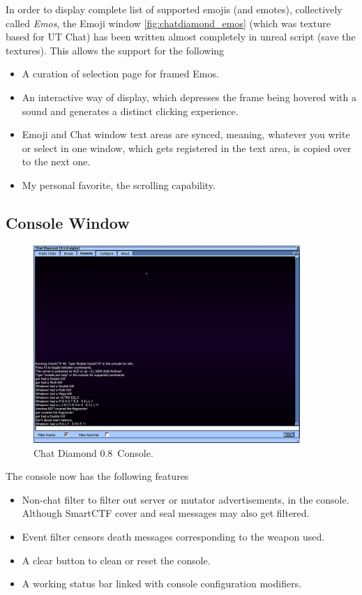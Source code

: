 \documentclass{article}
\theoremstyle{definition}
\newcommand{\ChatDiamondVersion}{0.8}
\begin{document}
In order to display complete list of supported emojis (and emotes), collectively called \emph{Emos}, the Emoji window \ref{fig:chatdiamond_emos} (which was texture based for UT Chat) has been 
written almost completely in unreal script (save the textures).  This allows the support for the following 
\begin{itemize}
\item A curation of selection page for framed Emos.
\item An interactive way of display, which depresses the frame being hovered with a sound and generates a distinct clicking
experience.
\item Emoji and Chat window text areas are synced, meaning, whatever you write or select in one window, which gets registered
in the text area, is copied over to the next one.
\item My personal favorite, the scrolling capability.
\end{itemize}


\subsection{Console Window}

\begin{figure}
\centering
\includegraphics[width=0.9\textwidth]{img_console}
\caption{Chat Diamond \ChatDiamondVersion~Console.}
\label{fig:chatdiamond_console}
\end{figure}

The console now has the following features
\begin{itemize}
\item Non-chat filter to filter out server or mutator advertisements, in the console. Although SmartCTF cover and seal messages may also get filtered.
\item Event filter censors death messages corresponding to the weapon used.
\item A clear button to clean or reset the console.
\item A working status bar linked with console configuration modifiers.
\end{itemize}
\end{document}
